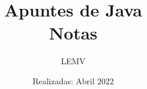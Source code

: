 \documentclass{article}
\title{Apuntes de Java\\
\Large{Notas}}
\author{LEMV}
\date{Realizadas: Abril 2022}
\begin{document}
\renewcommand*\contentsname{Índice}

\maketitle\newpage
\tableofcontents\newpage






\end{document}
